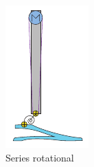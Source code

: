 \begin{figure}[hb!]
\begin{subfigure}{.19\textwidth}
    \includegraphics[width=\linewidth]{figures/illustration_serial_rotational.pdf}
    \caption{Series rotational}
    \label{fig:series_rotational}
  \end{subfigure}
  \begin{subfigure}{.19\textwidth}
    \centering

\end{subfigure}
\end{figure}
